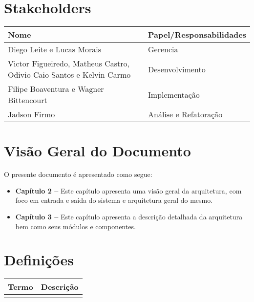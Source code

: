 \documentclass{report}
\begin{document}
  \section{Stakeholders}
    \FloatBarrier
    \begin{table}[H] 
      \begin{center}
        \begin{tabular}[pos]{|m{6cm} | m{8cm}|} 
          \hline 
          \cellcolor[gray]{0.9}\textbf{Nome} & \cellcolor[gray]{0.9}\textbf{Papel/Responsabilidades} \\ \hline
          Diego Leite e Lucas Morais & Gerencia  \\ \hline
           Victor Figueiredo, Matheus Castro, Odivio Caio Santos e Kelvin Carmo & Desenvolvimento  \\ \hline
           Filipe Boaventura e Wagner Bittencourt & Implementação  \\ \hline
           Jadson Firmo & Análise e Refatoração  \\ \hline
        \end{tabular}
      \end{center}
    \end{table} 

\section{Visão Geral do Documento}

O presente documento é apresentado como segue:\\

  \begin{itemize}
   \item \textbf{Capítulo 2 --} Este capítulo apresenta uma visão geral da arquitetura, com foco em entrada e saída do sistema e arquitetura geral do mesmo.
   \item \textbf{Capítulo 3 --} Este capítulo apresenta a descrição detalhada da arquitetura bem como seus módulos e componentes.
  \end{itemize}


  \section{Definições}
    \FloatBarrier
    \begin{table}[H]
      \begin{center}
        \begin{tabular}[pos]{|m{5cm} | m{9cm}|} 
          \hline
          \cellcolor[gray]{0.9}\textbf{Termo} & \cellcolor[gray]{0.9}\textbf{Descrição} \\ \hline
                          &                       \\ \hline
        \end{tabular}
      \end{center}
    \end{table}  
\end{document}
